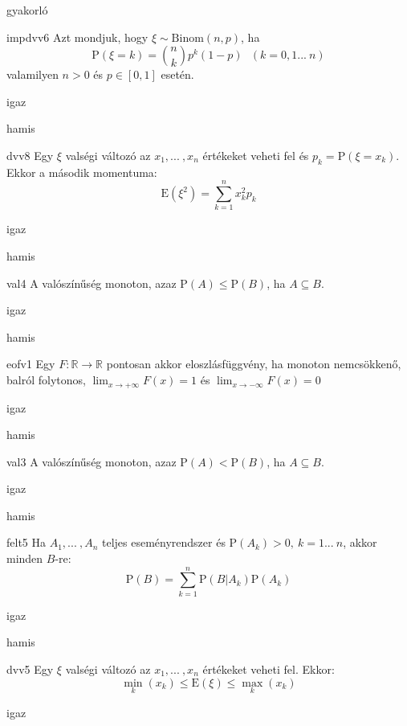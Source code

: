 \documentclass[12pt]{article}
\begin{document}
\begin{quiz}{gyakorló}
\begin{multi}[feedback={Def.}]{impdvv6}
Azt mondjuk, hogy $\xi\sim \mathrm{Binom}(n,p)$, ha 
$$
\mathrm{P}(\xi=k)=\binom{n}{k}p^k(1-p)\ \ \ (k=0,1{...\:} n)
$$
valamilyen $n>0$ és $p\in[0,1]$ esetén.
\item igaz
\item* hamis
\end{multi}
\begin{multi}[feedback={Def.}]{dvv8}
Egy $\xi$ valségi változó az $x_1,{...\:}, x_n$ értékeket veheti fel és $p_k=\mathrm{P}(\xi=x_k)$. 
Ekkor a második momentuma:
$$
\mathrm{E}(\xi^2)=\sum_{k=1}^n x_k^2 p_k
$$
\item* igaz
\item hamis
\end{multi}
\begin{multi}[feedback={$B=A\cup (B\setminus A)$+additívitás}]{val4}
A valószínűség monoton, azaz $\mathrm{P}(A)\le \mathrm{P}(B)$, ha $A\subseteq B$.
\item* igaz
\item hamis
\end{multi}
\begin{multi}[feedback={Def.}]{eofv1}
Egy $F:\mathbb{R}\to \mathbb{R}$ pontosan akkor eloszlásfüggvény, ha monoton nemcsökkenő, 
balról folytonos, $\lim_{x\to+\infty}F(x)=1$ és $\lim_{x\to-\infty}F(x)=0$
\item* igaz
\item hamis
\end{multi}
\begin{multi}[feedback={$A=B$?}]{val3}
A valószínűség monoton, azaz $\mathrm{P}(A)<\mathrm{P}(B)$, ha $A\subseteq B$.
\item igaz
\item* hamis
\end{multi}
\begin{multi}[feedback={Teljes valség tétele.}]{felt5}
Ha $A_1,{...\:},A_n$ teljes eseményrendszer és $\mathrm{P}(A_k)>0,\ k=1{...\:} n$, akkor minden $B$-re:
$$
\mathrm{P}(B)=\sum_{k=1}^n \mathrm{P}(B|A_k)\mathrm{P}(A_k)
$$
\item* igaz
\item hamis
\end{multi}
\begin{multi}[feedback={Az adott feltételek mellet a várható érték egy súlyozott közép.}]{dvv5}
Egy $\xi$ valségi változó az $x_1,{...\:}, x_n$ értékeket veheti fel. Ekkor:
$$
\min_k(x_k)\le \mathrm{E}(\xi) \le \max_k(x_k)
$$
\item* igaz

\end{multi}
\end{quiz}
\end{document}
